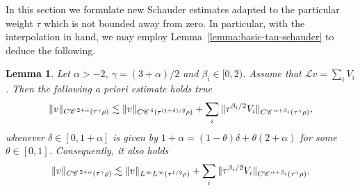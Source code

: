 \documentclass[a4paper,11pt]{article}
\newtheorem{lemma}[theorem]{Lemma}
\numberwithin{equation}{section}
\newcommand{\CC}{\mathscr{C} \hspace{.1em}}
\newcommand{\LL}{\mathscr{L}}
\newcommand{\8}{\infty}
\begin{document}
In this section we formulate new Schauder estimates  adapted to the particular weight $\tau$ which is not bounded away from zero. 
In particular, with the interpolation in hand, we may  employ Lemma~\ref{lemma:basic-tau-schauder} to deduce the following.


\begin{lemma}
  \label{lemma:tau-weighted-schauder}
   Let $\alpha
  > - 2$, $\gamma = (3 + \alpha) / 2$ and $\beta_i \in [0, 2)$. Assume that
  $\LL v = \sum_i V_i$. Then the following a priori estimate holds true
  \[ \| v \|_{C \CC^{2 + \alpha} (\tau^{\gamma} \rho)} \lesssim \| v \|_{C
     \CC^{\delta} (\tau^{(1 + \delta) / 2} \rho)} + \sum_i \| \tau^{\beta_i /
     2} V_i \|_{C \CC^{\alpha + \beta_i} (\tau^{\gamma} \rho)}, \]
  whenever $\delta \in [0, 1 + \alpha]$ is given by $1 + \alpha = (1 - \theta)
  \delta + \theta (2 + \alpha)$ for some $\theta \in [0, 1]$. Consequently, it
  also holds
  \[ \| v \|_{C \CC^{2 + \alpha} (\tau^{\gamma} \rho)} \lesssim \| v
     \|_{L^{\infty} L^{\infty} (\tau^{1 / 2} \rho)} + \sum_i \| \tau^{\beta_i
     / 2} V_i \|_{C \CC^{\alpha + \beta_i} (\tau^{\gamma} \rho)} . \]
\end{lemma}
\end{document}
